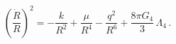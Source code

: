 \begin{equation} 
\left(\frac{\dot{R}}{R}\right)^2=-\frac{k}{R^2}+\frac{\mu}{R^4}-
\frac{q^2}{R^6}+\frac{8\pi G_4}{3}\,\Lambda_4\,.
\label{critical}
\end{equation}

